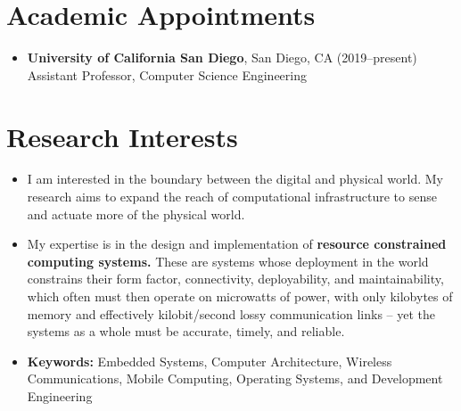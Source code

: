 \documentclass{article}
\begin{document}
%
%
%


\section*{Academic Appointments}

\begin{itemize}
  \item[]
    \textbf{University of California San Diego}, San Diego, CA (2019--present) \\
    Assistant Professor, Computer Science Engineering
\end{itemize}

\section*{Research Interests}
\begin{itemize}
  \item[] I am interested in the boundary between the digital and physical world.
My research aims to expand the reach of computational infrastructure to sense
and actuate more of the physical world.

  \item[] My expertise is in the design and implementation of \textbf{resource constrained computing systems.}
These are systems whose deployment in the world constrains their form factor, connectivity, deployability, and maintainability, which often must then operate on microwatts of power, with only kilobytes of memory and effectively kilobit/second lossy communication links – yet the systems as a whole must be accurate, timely, and reliable.

  \item[] \textbf{Keywords:} Embedded Systems, Computer Architecture, Wireless Communications, Mobile Computing, Operating Systems, and Development Engineering
\end{itemize}
\end{document}
